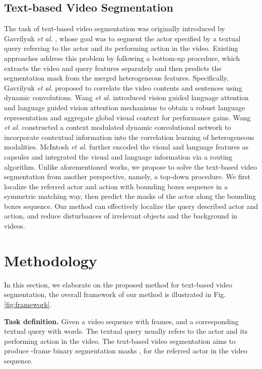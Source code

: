 \documentclass[journal]{IEEEtran}
\begin{document}
\subsection{Text-based Video Segmentation}

The task of text-based video segmentation was originally introduced by Gavrilyuk \emph{et al.} \cite{gavrilyuk2018actor}, whose goal was to segment the actor specified by a textual query referring to the actor and its performing action in the video. Existing approaches address this problem by following a bottom-up procedure, which extracts the video and query features separately and then predicts the segmentation mask from the merged heterogeneous features. Specifically, Gavrilyuk \emph{et al.} \cite{gavrilyuk2018actor} proposed to correlate the video contents and sentences using dynamic convolutions. Wang \emph{et al.}  \cite{wang2019asymmetric} introduced vision guided language attention and language guided vision attention mechanisms to obtain a robust language representation and aggregate global visual context for performance gains. Wang \emph{et al.} \cite{wang2020context} constructed a context modulated dynamic convolutional network to incorporate contextual information into the correlation learning of heterogeneous modalities. McIntosh \emph{et al.} \cite{mcintosh2018multi} further encoded the visual and language features as capsules and integrated the visual and language information via a routing algorithm. Unlike aforementioned works, we propose to solve the text-based video segmentation from another perspective, namely, a top-down procedure. We first localize the referred actor and action with bounding boxes sequence in a symmetric matching way, then predict the masks of the actor along the bounding boxes sequence. Our method can effectively localize the query described actor and action, and reduce disturbances of irrelevant objects and the background in videos.


\section{Methodology}
In this section, we elaborate on the proposed method for text-based video segmentation, the overall framework of our method is illustrated in Fig. \ref{fig:framework}.

\textbf{Task definition.} Given a video sequence  with  frames, and a corresponding textual query  with  words. The textual query usually refers to the actor and its performing action in the video. The text-based video segmentation aims to produce -frame binary segmentation masks ,  for the referred actor in the video sequence.
\end{document}
